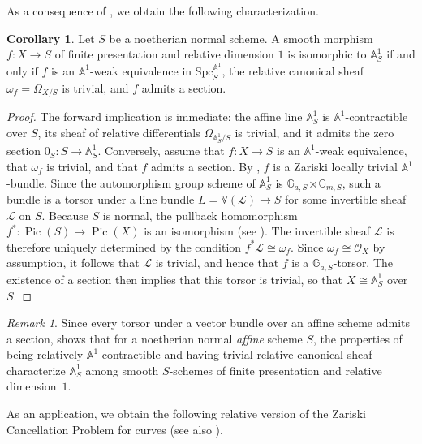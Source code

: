 \documentclass[10pt]{amsart}
\renewcommand{\AA}{\mathbb{A}}
\newcommand{\GG}{\mathbb{G}}
\numberwithin{equation}{section} %
\theoremstyle{plain}
\theoremstyle{definition}
\newtheorem{corollary}[corollary]{Corollary}
\theoremstyle{remark}
\newtheorem{remark}[remark]{Remark}
\newcommand{\Pic}{\operatorname{Pic}}
\begin{document}
\smallskip

As a consequence of , we obtain the following characterization.

\begin{corollary}\label{A1unique:DD}
Let $S$ be a noetherian normal scheme. A smooth morphism $f:X\to S$ of finite presentation and relative dimension $1$ is isomorphic to $\AA^1_S$ if and only if $f$ is an $\AA^1$-weak equivalence in $\mathrm{Spc}_S^{\AA^1}$, the relative canonical sheaf $\omega_f=\Omega_{X/S}$ is trivial, and $f$ admits a section.
\end{corollary}

\begin{proof}
The forward implication is immediate: the affine line $\AA^1_S$ is $\AA^1$-contractible over $S$, its sheaf of relative differentials $\Omega_{\AA^1_S/S}$ is trivial, and it admits the zero section $0_S:S\to \AA^1_S$. Conversely, assume that $f:X\to S$ is an $\AA^1$-weak equivalence, that $\omega_f$ is trivial, and that $f$ admits a section. By , $f$ is a Zariski locally trivial $\AA^1$-bundle. Since the automorphism group scheme of $\AA^1_S$ is $\GG_{a,S}\rtimes \GG_{m,S}$, such a bundle is a torsor under a line bundle $L=\mathbb{V}(\mathcal{L})\to S$ for some invertible sheaf $\mathcal{L}$ on $S$. Because $S$ is normal, the pullback homomorphism $f^*:\Pic(S)\to \Pic(X)$ is an isomorphism (see \cite[Theorem~5]{magid1975picard}). The invertible sheaf $\mathcal{L}$ is therefore uniquely determined by the condition $f^*\mathcal{L}\cong \omega_f$. Since $\omega_f\cong \mathcal{O}_X$ by assumption, it follows that $\mathcal{L}$ is trivial, and hence that $f$ is a $\GG_{a,S}$-torsor. The existence of a section then implies that this torsor is trivial, so that $X\cong \AA^1_S$ over $S$.
\end{proof}

\begin{remark}
Since every torsor under a vector bundle over an affine scheme admits a section,  shows that for a noetherian normal \emph{affine} scheme $S$, the properties of being relatively $\AA^1$-contractible and having trivial relative canonical sheaf characterize $\AA^1_S$ among smooth $S$-schemes of finite presentation and relative dimension~$1$.
\end{remark}

As an application, we obtain the following relative version of the Zariski Cancellation Problem for curves (see also \cite{Ha75}).
\end{document}
